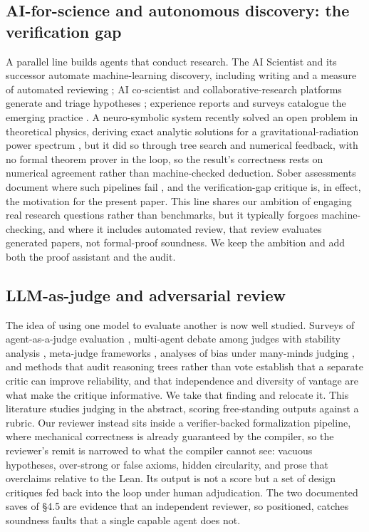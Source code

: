 \documentclass[11pt]{article}
\begin{document}
\subsection{AI-for-science and autonomous discovery: the verification gap}

A parallel line builds agents that conduct research. The AI Scientist and its successor automate
machine-learning discovery, including writing and a measure of automated reviewing \cite{r1,r2};
AI co-scientist and collaborative-research platforms generate and triage hypotheses \cite{r3}; experience
reports and surveys catalogue the emerging practice \cite{r17,r18}. A neuro-symbolic system recently
solved an open problem in theoretical physics, deriving exact analytic solutions for a
gravitational-radiation power spectrum \cite{r4}, but it did so through tree search and numerical
feedback, with no formal theorem prover in the loop, so the result's correctness rests on numerical
agreement rather than machine-checked deduction. Sober assessments document where such pipelines
fail \cite{r7}, and the verification-gap critique \cite{r6} is, in effect, the motivation for the present paper.
This line shares our ambition of engaging real research questions rather than benchmarks, but it
typically forgoes machine-checking, and where it includes automated review, that review evaluates
generated papers, not formal-proof soundness. We keep the ambition and add both the proof assistant
and the audit.

\subsection{LLM-as-judge and adversarial review}

The idea of using one model to evaluate another is now well studied. Surveys of agent-as-a-judge
evaluation \cite{r19}, multi-agent debate among judges with stability analysis \cite{r20}, meta-judge
frameworks \cite{r21}, analyses of bias under many-minds judging \cite{r22}, and methods that audit reasoning
trees rather than vote \cite{r23} establish that a separate critic can improve reliability, and that
independence and diversity of vantage are what make the critique informative. We take that finding
and relocate it. This literature studies judging in the abstract, scoring free-standing outputs
against a rubric. Our reviewer instead sits inside a verifier-backed formalization pipeline, where
mechanical correctness is already guaranteed by the compiler, so the reviewer's remit is narrowed
to what the compiler cannot see: vacuous hypotheses, over-strong or false axioms, hidden
circularity, and prose that overclaims relative to the Lean. Its output is not a score but a set of
design critiques fed back into the loop under human adjudication. The two documented saves of §4.5
are evidence that an independent reviewer, so positioned, catches soundness faults that a single
capable agent does not.
\end{document}
